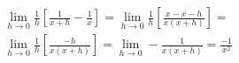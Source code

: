 \begin{ex}
\begin{align}
&\lim_{h\rightarrow 0} \frac{1}{h}\left[\frac{1}{x+h}-\frac{1}{x}\right]=\lim_{h\rightarrow 0} \frac{1}{h}\left[\frac{x-x-h}{x(x+h)}\right]=\nonumber\\
&\lim_{h\rightarrow 0} \frac{1}{h}\left[\frac{-h}{x(x+h)}\right]=\lim_{h\rightarrow 0} -\frac{1}{x(x+h)}=\frac{-1}{x^2}\nonumber
\end{align}
\end{ex}